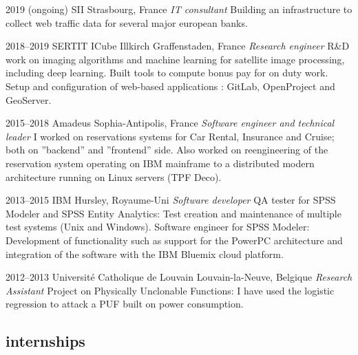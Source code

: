 \documentclass[]{friggeri-cv} %
\begin{document}
\begin{entrylist}



\entry
{2019 (ongoing)}
{SII}
{Strasbourg, France}
{\emph{IT consultant}
\medbreak
Building an infrastructure to collect web traffic data for several
major european banks.
\bigbreak %
}

\entry
{2018--2019}
{SERTIT ICube}
{Illkirch Graffenstaden, France}
{\emph{Research engineer}
\medbreak
R\&D work on imaging algorithms and machine learning for satellite image 
processing, including deep learning.
\smallbreak
Built tools to compute bonus pay for on duty work.
\smallbreak
Setup and configuration of web-based applications : GitLab,
    OpenProject and GeoServer. 
\bigbreak %
}

\entry
{2015--2018}
{Amadeus}
{Sophia-Antipolis, France}
{\emph{Software engineer and technical leader}
\medbreak
I worked on reservations systems for Car Rental, Insurance and Cruise; both
on ”backend” and ”frontend” side.
\smallbreak
Also worked on reengineering of the reservation system operating on IBM
mainframe to a distributed modern architecture running on Linux servers
(TPF Deco).
\bigbreak %
}

\entry
{2013--2015}
{IBM}
{Hursley, Royaume-Uni}
{\emph{Software developer}
\medbreak
QA tester for SPSS Modeler and SPSS Entity Analytics: Test creation and
maintenance of multiple test systems (Unix and Windows).
\smallbreak
Software engineer for SPSS Modeler: Development of functionality such as
support for the PowerPC architecture and integration of the software with
the IBM Bluemix cloud platform.
\bigbreak %
}

\entry
{2012--2013}
{Université Catholique de Louvain}
{Louvain-la-Neuve, Belgique}
{\emph{Research Assistant}
\medbreak
Project on Physically Unclonable Functions: I have used the logistic regression
to attack a PUF built on power consumption.
}

\end{entrylist}

\newpage

\subsection{internships}
\end{document}
